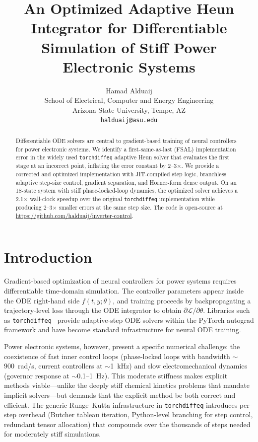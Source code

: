\documentclass[11pt]{article}
\title{An Optimized Adaptive Heun Integrator for Differentiable\\
       Simulation of Stiff Power Electronic Systems}
\author{Hamad Alduaij\\
School of Electrical, Computer and Energy Engineering\\
Arizona State University, Tempe, AZ\\
\texttt{halduaij@asu.edu}}
\date{}
\begin{document}
\maketitle

\begin{abstract}
Differentiable ODE solvers are central to gradient-based training of
neural controllers for power electronic systems.  We identify a
first-same-as-last (FSAL) implementation error in the widely used
\texttt{torchdiffeq} adaptive Heun solver that evaluates the first
stage at an incorrect point, inflating the error constant by
2--3$\times$.  We provide a corrected and optimized implementation
with JIT-compiled step logic, branchless adaptive step-size control,
gradient separation, and Horner-form dense output.  On an 18-state
system with stiff phase-locked-loop dynamics, the optimized solver
achieves a 2.1$\times$ wall-clock speedup over the original
\texttt{torchdiffeq} implementation while producing 2--3$\times$
smaller errors at the same step size.  The code is open-source at
\url{https://github.com/halduaij/inverter-control}.
\end{abstract}

\section{Introduction}
\label{sec:intro}

Gradient-based optimization of neural controllers for power systems
requires differentiable time-domain simulation.  The controller
parameters appear inside the ODE right-hand side $f(t, y; \theta)$, and
training proceeds by backpropagating a trajectory-level loss through the
ODE integrator to obtain $\partial \mathcal{L}/\partial\theta$.
Libraries such as \texttt{torchdiffeq}~\cite{Chen18NeuralODE} provide
adaptive-step ODE solvers within the PyTorch autograd framework and have
become standard infrastructure for neural ODE training.

Power electronic systems, however, present a specific numerical
challenge: the coexistence of fast inner control loops (phase-locked
loops with bandwidth $\sim$900~rad/s, current controllers at
$\sim$1~kHz) and slow electromechanical dynamics (governor response at
$\sim$0.1--1~Hz).  This moderate stiffness makes explicit methods
viable---unlike the deeply stiff chemical kinetics problems that mandate
implicit solvers---but demands that the explicit method be both correct
and efficient.  The generic Runge--Kutta infrastructure in
\texttt{torchdiffeq} introduces per-step overhead (Butcher tableau
iteration, Python-level branching for step control, redundant tensor
allocation) that compounds over the thousands of steps needed for
moderately stiff simulations.
\end{document}
